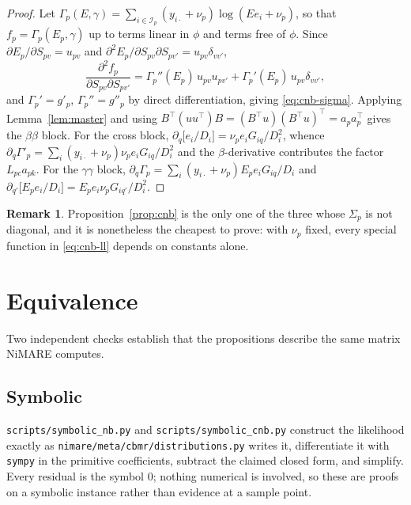 \documentclass[11pt,a4paper]{article}
\theoremstyle{plain}
\theoremstyle{definition}
\newtheorem{remark}[proposition]{Remark}
\newcommand{\E}{\mathcal{I}}
\begin{document}
\begin{proof}
Let $\Gamma_p(E,\gamma) = \sum_{i\in\E_p}(y_{i\cdot}+\nu_p)\log(Ee_i+\nu_p)$, so that
$f_p = \Gamma_p(E_p, \gamma)$ up to terms linear in $\phi$ and terms free of $\phi$. Since
$\partial E_p/\partial S_{pv} = u_{pv}$ and
$\partial^2 E_p/\partial S_{pv}\partial S_{pv'} = u_{pv}\delta_{vv'}$,
\[
  \frac{\partial^2 f_p}{\partial S_{pv}\partial S_{pv'}}
   = \Gamma_p''(E_p)\,u_{pv}u_{pv'} + \Gamma_p'(E_p)\,u_{pv}\delta_{vv'} ,
\]
and $\Gamma_p' = g'_p$, $\Gamma_p'' = g''_p$ by direct differentiation, giving
\eqref{eq:cnb-sigma}. Applying Lemma~\ref{lem:master} and using
$B^\top(u u^\top)B = (B^\top u)(B^\top u)^\top = a_pa_p^\top$ gives the $\beta\beta$ block. For
the cross block, $\partial_q \bigl[e_i/D_i\bigr] = \nu_p e_i G_{iq}/D_i^2$, whence
$\partial_q \Gamma'_p = \sum_i (y_{i\cdot}+\nu_p)\nu_pe_iG_{iq}/D_i^2$ and the
$\beta$-derivative contributes the factor $L_{pc}a_{pk}$. For the $\gamma\gamma$ block,
$\partial_q \Gamma_p = \sum_i (y_{i\cdot}+\nu_p)E_pe_iG_{iq}/D_i$ and
$\partial_{q'}\bigl[E_pe_i/D_i\bigr] = E_pe_i\nu_pG_{iq'}/D_i^2$.
\end{proof}

\begin{remark}
Proposition~\ref{prop:cnb} is the only one of the three whose $\Sigma_p$ is not diagonal, and it
is nonetheless the cheapest to prove: with $\nu_p$ fixed, every special function in
\eqref{eq:cnb-ll} depends on constants alone.
\end{remark}

\section{Equivalence}

Two independent checks establish that the propositions describe the same matrix NiMARE computes.

\subsection{Symbolic}

\texttt{scripts/symbolic\_nb.py} and \texttt{scripts/symbolic\_cnb.py} construct the likelihood
exactly as \texttt{nimare/meta/cbmr/distributions.py} writes it, differentiate it with
\texttt{sympy} in the primitive coefficients, subtract the claimed closed form, and simplify.
Every residual is the symbol $0$; nothing numerical is involved, so these are proofs on a
symbolic instance rather than evidence at a sample point.
\end{document}
